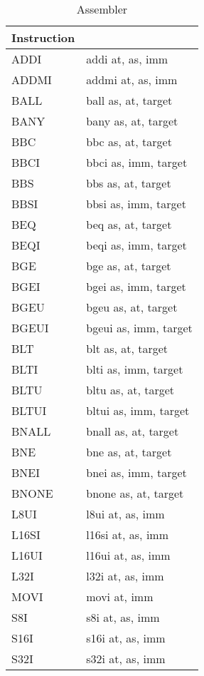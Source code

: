 	\begin{longtable}{|p{5cm}|p{5cm}|}
		\caption{Assembler\label{long}}\\
		\hline
		Instruction & \\
		\hline
		ADDI & addi at, as, imm\\ \hline
		ADDMI & addmi at, as, imm\\ \hline
		BALL & ball as, at, target\\ \hline
		BANY & bany as, at, target\\ \hline
		BBC & bbc as, at, target\\ \hline
		BBCI & bbci as, imm, target\\ \hline
		BBS & bbs as, at, target\\ \hline
		BBSI & bbsi as, imm, target\\ \hline
		BEQ & beq as, at, target\\ \hline
		BEQI & beqi as, imm, target\\ \hline
		BGE & bge as, at, target\\ \hline
		BGEI & bgei as, imm, target\\ \hline
		BGEU & bgeu as, at, target\\ \hline
		BGEUI & bgeui as, imm, target\\ \hline
		BLT & blt as, at, target\\ \hline
		BLTI & blti as, imm, target\\ \hline
		BLTU & bltu as, at, target\\ \hline
		BLTUI & bltui as, imm, target\\ \hline
		BNALL & bnall as, at, target\\ \hline
		BNE & bne as, at, target\\ \hline
		BNEI & bnei as, imm, target\\ \hline
		BNONE & bnone as, at, target\\ \hline
		L8UI & l8ui at, as, imm\\ \hline
		L16SI & l16si at, as, imm\\ \hline
		L16UI & l16ui at, as, imm\\ \hline
		L32I & l32i at, as, imm\\ \hline
		MOVI & movi at, imm\\ \hline
		S8I & s8i at, as, imm\\ \hline
		S16I & s16i at, as, imm\\ \hline
		S32I & s32i at, as, imm\\ \hline
	\end{longtable}
